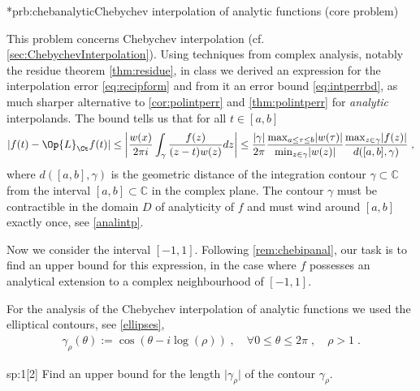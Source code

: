 
\begin{samproblem}*{prb:chebanalytic}{Chebychev interpolation of analytic functions (core problem)}{
  This problem concerns Chebychev interpolation (cf. \cref{sec:ChebychevInterpolation}). Using techniques from complex
  analysis, notably the residue theorem \cref{thm:residue}, in class we derived an expression for the interpolation error 
  \cref{eq:recipform} and from it an error bound \cref{eq:intperrbd}, as much sharper alternative to \cref{cor:polintperr}
  and \cref{thm:polintperr} for \emph{analytic} interpolands. 
  The bound tells us that for all $t\in [a,b]$
  \begin{align*}
    \lvert f(t) - \Op{L}_{\Ct} f(t) \rvert 
      \leq 
    \left\lvert \frac{w(x)}{2 \pi i} \int_\gamma 
    \frac{f(z)}{(z-t) w(z)} dz \right\rvert 
      \leq 
    \frac{\lvert \gamma \rvert}{2 \pi} 
    \frac{\max_{a \leq \tau \leq b}\lvert w(\tau) \rvert}{\min_{z \in  \gamma}\lvert w(z) \rvert} 
    \frac{ \max_{z \in \gamma} \lvert f(z) \rvert }{d([a,b], \gamma)}\;,
  \end{align*}
  where {$d([a,b],\gamma)$} is the geometric distance of the integration contour $\gamma\subset\mathbb{C}$ from the interval 
  $[a,b]\subset\mathbb{C}$ in the complex plane. The contour $\gamma$ must be contractible in the domain $D$ of analyticity of 
  $f$ and must wind around $[a,b]$ exactly once, see \cref{analintp}. 

  Now we consider the interval $[-1,1]$. Following \cref{rem:chebipanal}, our task is to find an upper bound for this 
  expression, in the case where $f$ possesses an analytical extension to a complex neighbourhood of $[-1,1]$.

  For the analysis of the Chebychev interpolation of analytic functions we used the
  elliptical contours, see \cref{ellipses},
  \begin{align}
    \gamma_\rho(\theta) := \cos(\theta - i \log(\rho) )\;,\quad
    \forall 0 \leq \theta \leq 2 \pi\;,\quad \rho > 1\;.
  \end{align}
}


\begin{subproblem}{sp:1}[2]
 Find an upper bound for the length $\lvert \gamma_\rho \rvert$ of the contour $\gamma_\rho$.
 

\end{subproblem}
\end{samproblem}
